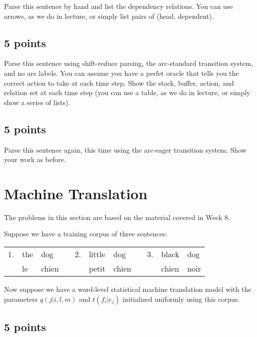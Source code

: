 \documentclass[12pt,a4paper]{article}
\begin{document}
Parse this sentence by hand and list the dependency relations. You can use arrows, as we do in lecture, or simply list pairs of (head, dependent).

\subsection{5 points}

Parse this sentence using shift-reduce parsing, the arc-standard transition system, and no arc labels. You can assume you have a perfet oracle that tells you the correct action to take at each time step. Show the stack, buffer, action, and relation set at each time step (you can use a table, as we do in lecture, or simply show a series of lists).

\subsection{5 points}

Parse this sentence again, this time using the arc-eager transition system. Show your work as before.

\section{Machine Translation}

The problems in this section are based on the material covered in Week 8.

\vspace{\baselineskip}

Suppose we have a training corpus of three sentences:

\begin{center}
\begin{tabular}{r l l c r l l c r l l}
1. & the & dog & & 2. & little & dog & & 3. & black & dog \\
& le & chien & & & petit & chien & & & chien & noir \\
\end{tabular}
\end{center}

Now suppose we have a word-level statistical machine translation model with the parameters $q(j|i, l, m)$ and $t(f_i | e_j)$ initialized uniformly using this corpus.

\subsection{5 points}
\end{document}
